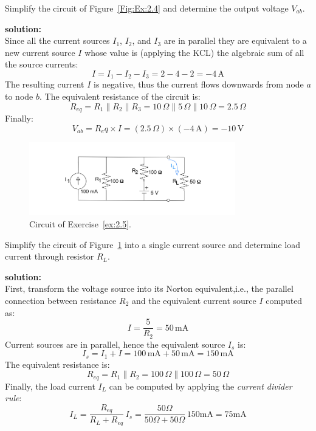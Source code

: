\begin{exercise}
\label{ex:2.4}
Simplify the circuit of Figure~\ref{Fig:Ex:2.4} and determine the output voltage $V_{ab}$.

\textbf{solution:}\\
Since all the current sources $I_1$, $I_2$, and $I_3$ are in parallel they are equivalent to a new current source $I$ whose value is (applying the KCL) the algebraic sum of all the source currents:
\[I= I_1 - I_2 - I_3 = 2 - 4 - 2 = -4\,\textrm{A}\]
The resulting current $I$ is negative, thus the current flows downwards from node $a$ to node $b$.
The equivalent resistance of the circuit is:
\[R_{eq} = R_1 \parallel R_2 \parallel R_3 = 10\,\Omega \parallel 5\,\Omega \parallel 10\,\Omega = 2.5\,\Omega\]
Finally:
\[V_{ab} = R_eq \times I = (2.5\,\Omega)\times (-4\,\textrm{A})= -10\,\textrm{V}\]  
\end{exercise}

\begin{figure}[h!]
  \centering
  \includegraphics[width=0.8\textwidth]{"images/Fig-19"}
  \caption{Circuit of Exercise~\ref{ex:2.5}.} 
  \label{Fig:Ex:2.5}
\end{figure}

\begin{exercise}
\label{ex:2.5}
Simplify the circuit of Figure~\ref{Fig:Ex:2.5} into a single current source and determine load current through resistor $R_L$.

\textbf{solution:}\\
First, transform the voltage source into its Norton equivalent,i.e., the parallel connection between resistance $R_2$ and the equivalent current source $I$ computed as:
\[I =\frac{5}{R_2} = 50\,\textrm{mA}\]
Current sources are in parallel, hence the equivalent source $I_s$ is:
\[I_s = I_1 + I = 100\,\textrm{mA} + 50\,\textrm{mA} = 150\,\textrm{mA}\]
The equivalent resistance is:
\[R_{eq} = R_1\parallel R_2 = 100\,\Omega \parallel 100\,\Omega = 50\,\Omega\]
Finally, the load current $I_L$ can be computed by applying the \emph{current divider rule}:
\[I_L = \frac{R_{eq}}{R_L + R_{eq}}\,I_s = \frac{50\Omega}{50\Omega + 50\Omega}\,150\textrm{mA} =75\textrm{mA}\]
\end{exercise}
